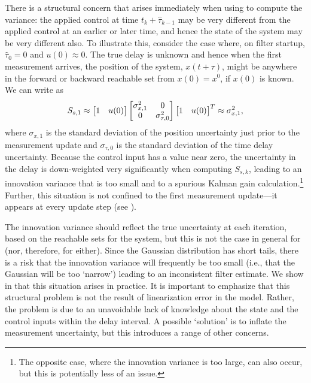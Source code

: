 \documentclass[letterpaper,10pt,conference]{ieeeconf}
\theoremstyle{definition}
\begin{document}
There is a structural concern that arises immediately when using  to compute the variance: the applied control at time $t_{k} + \hat{\tau}_{k - 1}$ may be very different from the applied control at an earlier or later time, and hence the state of the system may be very different also.
%
To illustrate this, consider the case where, on filter startup, $\hat{\tau}_{0} = 0$ and $u(0) \approx 0$.
%
The true delay is unknown and hence when the first measurement arrives, the position of the system, $x(t + \tau)$, might be anywhere in the forward or backward reachable set from $x(0) = x^{0}$, if $x(0)$ is known.
%
We can write  as
%
\begin{equation}
S_{s, 1} \approx
\begin{bmatrix}
1 & u(0)
\end{bmatrix}
\begin{bmatrix}
\sigma_{x, 1}^{2} & 0 \\
0 & \sigma_{\tau, 0}^{2}
\end{bmatrix}
\begin{bmatrix}
1 & u(0)
\end{bmatrix}^{T}
\approx
\sigma_{x, 1}^{2},
\end{equation}
%
where $\sigma_{x, 1}$ is the standard deviation of the position uncertainty just prior to the measurement update and $\sigma_{\tau, 0}$ is the standard deviation of the time delay uncertainty.
%
Because the control input has a value near zero, the uncertainty in the delay is down-weighted very significantly when computing $S_{s, k}$, leading to an innovation variance that is too small and to a spurious Kalman gain calculation.\footnote{The opposite case, where the innovation variance is too large, can also occur, but this is potentially less of an issue.}
%
Further, this situation is not confined to the first measurement update---it appears at every update step (see ).

The innovation variance should reflect the true uncertainty at each iteration, based on the reachable sets for the system, but this is not the case in general for  (nor, therefore, for  either).
%
Since the Gaussian distribution has short tails, there is a risk that the innovation variance will frequently be too small (i.e., that the Gaussian will be too `narrow') leading to an inconsistent filter estimate.
%
We show in  that this situation arises in practice.
%
It is important to emphasize that this structural problem is not the result of linearization error in the model. 
%
Rather, the problem is due to an unavoidable lack of knowledge about the state and the control inputs within the delay interval.
%
A possible `solution' is to inflate the measurement uncertainty, but this introduces a range of other concerns.
\end{document}
